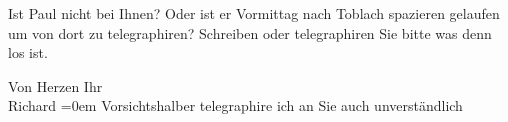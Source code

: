 \pstart
           Ist Paul nicht bei Ihnen? Oder ist er
               Vormittag nach Toblach spazieren gelaufen um von
               dort zu tele{\pb}graphiren? Schreiben
               oder telegraphiren Sie bitte was denn los ist.\pend
           
\pstart
           Von Herzen Ihr{\\[\baselineskip]}\spacefill\mbox{Richard}\pend
           \leftskip=0em{}
\pstart
           Vorsichtshalber telegraphire ich an Sie auch unverständlich\pend
           \endnumbering{}  \newcommand{\dateiname}{L01166}\newcommand{\titel}{Richard Beer-Hofmann an Arthur Schnitzler, 21. 8. 1901}\newcommand{\editorInnen}{Martin Anton Müller und Gerd-Hermann Susen}
